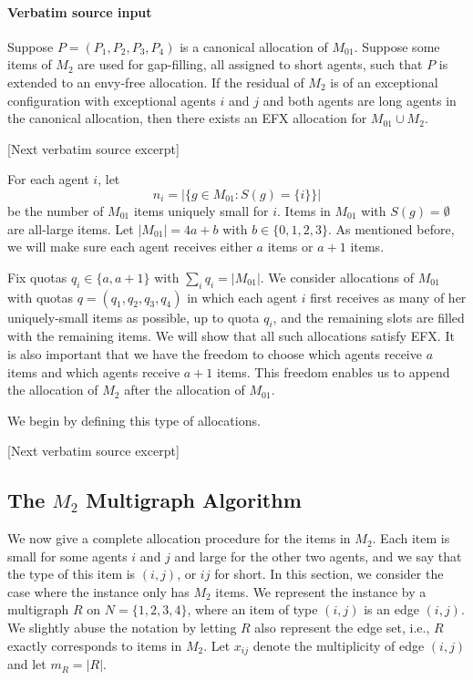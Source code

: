 \documentclass[10pt]{article}
\begin{document}
\paragraph{Verbatim source input}
\begin{ReviewVerbatim}
\begin{lemma}\label{lem:easycombine}
    Suppose $P=(P_1,P_2,P_3,P_4)$ is a canonical allocation of $M_{01}$. Suppose some items of \(M_2\) are used for gap-filling, all assigned to short agents, such that \(P\) is extended to an envy-free allocation.
    If the residual of $M_2$ is of an exceptional configuration with exceptional agents $i$ and $j$ and both agents are long agents in the canonical allocation, then there exists an EFX allocation for $M_{01}\cup M_2$.
\end{lemma}

[Next verbatim source excerpt]

For each agent $i$, let
\[
 n_i=\left|\{g\in M_{01}:S(g)=\{i\}\}\right|
\]
be the number of $M_{01}$ items uniquely small for $i$.  Items in $M_{01}$
with $S(g)=\emptyset$ are all-large items.
Let $|M_{01}|=4a+b$ with $b\in\{0,1,2,3\}$.
As mentioned before, we will make sure each agent receives either $a$ items or $a+1$ items.

Fix quotas $q_i\in\{a,a+1\}$ with $\sum_i q_i=|M_{01}|$.
We consider allocations of $M_{01}$ with quotas $q=(q_1,q_2,q_3,q_4)$ in which each agent $i$ first receives as many of her uniquely-small items as possible, up to quota $q_i$, and the remaining slots are filled with the remaining items.
We will show that all such allocations satisfy EFX.
It is also important that we have the freedom to choose which agents receive $a$ items and which agents receive $a+1$ items.
This freedom enables us to append the allocation of $M_2$ after the allocation of $M_{01}$.

We begin by defining this type of allocations.


[Next verbatim source excerpt]

\subsection{The $M_2$ Multigraph Algorithm}
\label{subsec:2}
We now give a complete allocation procedure for the items in $M_2$.
Each item is small for some agents $i$ and $j$ and
large for the other two agents, and we say that the type of this item is $(i,j)$, or $ij$ for short.
In this section, we consider the case where the instance only has $M_{2}$ items.
We represent the instance by a
multigraph $R$ on $N=\{1,2,3,4\}$, where an item of type $(i,j)$ is an edge $(i,j)$.
We slightly abuse the notation by letting $R$ also represent the edge set, i.e., $R$ exactly corresponds to items in $M_2$.
Let $x_{ij}$ denote the multiplicity of edge $(i,j)$ and let $m_R=|R|$.


\end{ReviewVerbatim}
\end{document}
